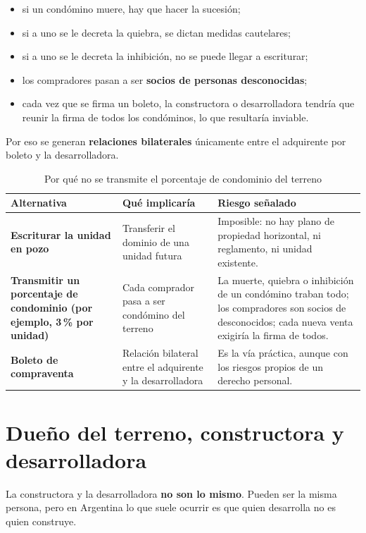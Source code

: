 \documentclass[12pt,oneside]{book}
\begin{document}
\begin{itemize}
    \item si un condómino muere, hay que hacer la sucesión;
    \item si a uno se le decreta la quiebra, se dictan medidas cautelares;
    \item si a uno se le decreta la inhibición, no se puede llegar a escriturar;
    \item los compradores pasan a ser \textbf{socios de personas desconocidas};
    \item cada vez que se firma un boleto, la constructora o desarrolladora tendría que reunir la firma de todos los condóminos, lo que resultaría inviable.
\end{itemize}

Por eso se generan \textbf{relaciones bilaterales} únicamente entre el adquirente por boleto y la desarrolladora.

\begin{table}[H]
\centering
\small
\begin{tabularx}{\textwidth}{>{\raggedright\arraybackslash}p{3.3cm}YY}
\toprule
\textbf{Alternativa} & \textbf{Qué implicaría} & \textbf{Riesgo señalado} \\
\midrule
\textbf{Escriturar la unidad en pozo} & Transferir el dominio de una unidad futura & Imposible: no hay plano de propiedad horizontal, ni reglamento, ni unidad existente. \\
\addlinespace
\textbf{Transmitir un porcentaje de condominio (por ejemplo, 3\,\% por unidad)} & Cada comprador pasa a ser condómino del terreno & La muerte, quiebra o inhibición de un condómino traban todo; los compradores son socios de desconocidos; cada nueva venta exigiría la firma de todos. \\
\addlinespace
\textbf{Boleto de compraventa} & Relación bilateral entre el adquirente y la desarrolladora & Es la vía práctica, aunque con los riesgos propios de un derecho personal. \\
\bottomrule
\end{tabularx}
\caption{Por qué no se transmite el porcentaje de condominio del terreno}
\end{table}

\section{Dueño del terreno, constructora y desarrolladora}

La constructora y la desarrolladora \textbf{no son lo mismo}. Pueden ser la misma persona, pero en Argentina lo que suele ocurrir es que quien desarrolla no es quien construye.
\end{document}
